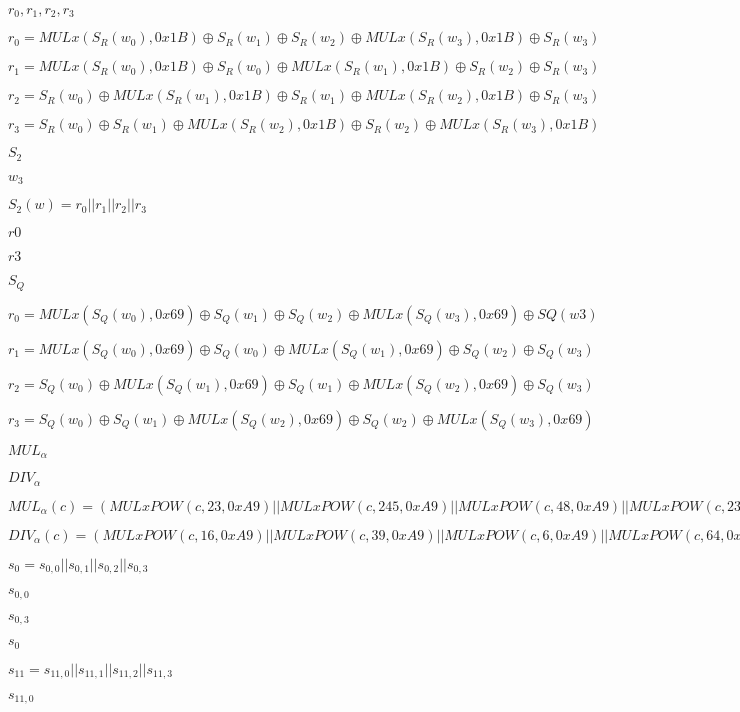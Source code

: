 \documentclass{article}
\begin{document}
$ r_0, r_1, r_2, r_3$
\pagebreak

$ r_0= MULx(S_R(w_0), 0x1B) \oplus S_R(w_1) \oplus S_R(w_2) \oplus MULx(S_R(w_3), 0x1B) \oplus S_R(w_3)$
\pagebreak

$ r_1= MULx(S_R(w_0), 0x1B) \oplus S_R(w_0) \oplus MULx(S_R(w_1), 0x1B) \oplus S_R(w_2) \oplus S_R(w_3)$
\pagebreak

$ r_2= S_R(w_0) \oplus MULx(S_R(w_1), 0x1B) \oplus S_R(w_1) \oplus MULx(S_R(w_2), 0x1B) \oplus S_R(w_3)$
\pagebreak

$ r_3= S_R(w_0) \oplus S_R(w_1) \oplus MULx(S_R(w_2), 0x1B) \oplus S_R(w_2) \oplus MULx(S_R(w_3), 0x1B)$
\pagebreak

$ S_2$
\pagebreak

$ w_3$
\pagebreak

$ S_2(w)= r_0 || r_1 || r_2 || r_3$
\pagebreak

$ r0$
\pagebreak

$ r3$
\pagebreak

$ S_Q$
\pagebreak

$ r_0= MULx(S_Q(w_0), 0x69) \oplus S_Q(w_1) \oplus S_Q(w_2) \oplus MULx(S_Q(w_3), 0x69) \oplus SQ(w3)$
\pagebreak

$ r_1= MULx(S_Q(w_0), 0x69) \oplus S_Q(w_0) \oplus MULx(S_Q(w_1), 0x69) \oplus S_Q(w_2) \oplus S_Q(w_3)$
\pagebreak

$ r_2= S_Q(w_0) \oplus MULx(S_Q(w_1), 0x69) \oplus S_Q(w_1) \oplus MULx(S_Q(w_2), 0x69) \oplus S_Q(w_3)$
\pagebreak

$ r_3= S_Q(w_0) \oplus S_Q(w_1) \oplus MULx(S_Q(w_2), 0x69) \oplus S_Q(w_2) \oplus MULx(S_Q(w_3), 0x69)$
\pagebreak

$ MUL_α$
\pagebreak

$ DIV_α$
\pagebreak

$ MUL_α(c) = (MULxPOW(c, 23, 0xA9) || MULxPOW(c, 245, 0xA9) || MULxPOW(c, 48, 0xA9) || MULxPOW(c, 239, 0xA9))$
\pagebreak

$ DIV_α(c) = (MULxPOW(c, 16, 0xA9) || MULxPOW(c, 39, 0xA9) || MULxPOW(c, 6, 0xA9) || MULxPOW(c, 64, 0xA9))$
\pagebreak

$ s_0 = s_{0,0} || s_{0,1} || s_{0,2} || s_{0,3}$
\pagebreak

$ s_{0,0}$
\pagebreak

$ s_{0,3}$
\pagebreak

$ s_0$
\pagebreak

$ s_{11} = s_{11,0} || s_{11,1} || s_{11,2} || s_{11,3}$
\pagebreak

$ s_{11,0}$
\pagebreak
\end{document}
